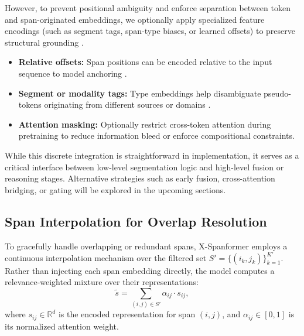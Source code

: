 However, to prevent positional ambiguity and enforce separation between token and span-originated embeddings, we optionally apply specialized feature encodings (such as segment tags, span-type biases, or learned offsets) to preserve structural grounding \cite{li2021prefix, shaw2018self, xue2022byt5}.
\begin{itemize}
  \item \textbf{Relative offsets:} Span positions can be encoded relative to the input sequence to model anchoring \cite{shaw2018self}.
  \item \textbf{Segment or modality tags:} Type embeddings help disambiguate pseudo-tokens originating from different sources or domains \cite{xue2022byt5, tay2021charformer}.
  \item \textbf{Attention masking:} Optionally restrict cross-token attention during pretraining to reduce information bleed or enforce compositional constraints.
\end{itemize}

While this discrete integration is straightforward in implementation, it serves as a critical interface between low-level segmentation logic and high-level fusion or reasoning stages. Alternative strategies such as early fusion, cross-attention bridging, or gating will be explored in the upcoming sections.

\subsection{Span Interpolation for Overlap Resolution}

To gracefully handle overlapping or redundant spans, X-Spanformer employs a continuous interpolation mechanism over the filtered set \( S' = \{(i_k, j_k)\}_{k=1}^{K'} \). Rather than injecting each span embedding directly, the model computes a relevance-weighted mixture over their representations:
\begin{equation}
  \tilde{s} = \sum_{(i,j) \in S'} \alpha_{ij} \cdot s_{ij}, \label{eq:span_interp}
\end{equation}
where \( s_{ij} \in \mathbb{R}^d \) is the encoded representation for span \((i,j)\), and \( \alpha_{ij} \in [0,1] \) is its normalized attention weight.

